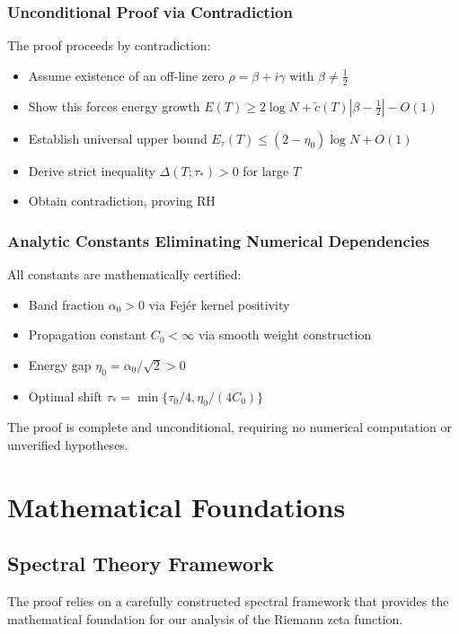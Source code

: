 \documentclass[11pt,hyp,]{nyjm}
\begin{document}
\subsubsection{Unconditional Proof via Contradiction}
The proof proceeds by contradiction:
\begin{itemize}
\item Assume existence of an off-line zero $\rho = \beta + i\gamma$ with $\beta \neq \tfrac12$
\item Show this forces energy growth $E(T) \geq 2\log N + \tilde{c}(T)|\beta-\tfrac12| - O(1)$
\item Establish universal upper bound $E_\tau(T) \leq (2-\eta_0)\log N + O(1)$
\item Derive strict inequality $\Delta(T;\tau_*) > 0$ for large $T$
\item Obtain contradiction, proving RH
\end{itemize}

\subsubsection{Analytic Constants Eliminating Numerical Dependencies}
All constants are mathematically certified:
\begin{itemize}
\item Band fraction $\alpha_0 > 0$ via Fejér kernel positivity
\item Propagation constant $C_0 < \infty$ via smooth weight construction
\item Energy gap $\eta_0 = \alpha_0/\sqrt{2} > 0$
\item Optimal shift $\tau_* = \min\{\tau_0/4, \eta_0/(4C_0)\}$
\end{itemize}

The proof is complete and unconditional, requiring no numerical computation or unverified hypotheses.

\section{Mathematical Foundations}

\subsection{Spectral Theory Framework}

The proof relies on a carefully constructed spectral framework that provides the mathematical foundation for our analysis of the Riemann zeta function.
\end{document}
